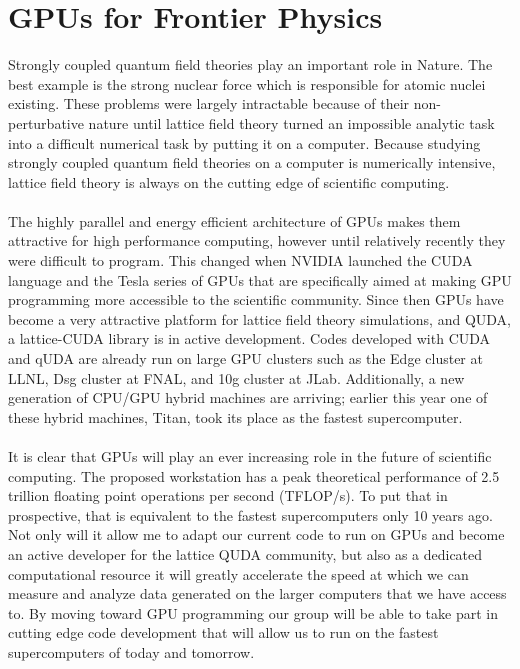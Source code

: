 \documentclass[11pt]{article}
\begin{document}
  \section*{GPUs for Frontier Physics}
  Strongly coupled quantum field theories play an important role in Nature.
  The best example is the strong nuclear force which is responsible for atomic nuclei existing.
  These problems were largely intractable because of their non-perturbative nature until lattice field theory turned an impossible analytic task into a difficult numerical task by putting it on a computer.
  Because studying strongly coupled quantum field theories  on a computer is numerically intensive, lattice field theory is always on the cutting edge of scientific computing. \\\\
 The highly parallel and energy efficient architecture of GPUs makes them attractive for high performance computing, however until relatively recently they were difficult to program.  
 This changed when NVIDIA launched the CUDA language and the Tesla series of GPUs that are specifically aimed at making GPU programming more accessible to the scientific community.
  Since then GPUs have become a very attractive platform for lattice field theory simulations, and QUDA, a lattice-CUDA library \cite{QUDA1,QUDA2,QUDA3} is in active development.
   Codes developed with CUDA and qUDA are already run on large GPU clusters such as the Edge cluster at LLNL, Dsg cluster at FNAL, and 10g cluster at JLab.
  Additionally, a new generation of CPU/GPU hybrid machines are arriving; earlier this year one of these hybrid machines, Titan, took its place as the fastest supercomputer.\\\\
  It is clear that GPUs will play an ever increasing role in the future of scientific computing. 
  The proposed workstation has a peak theoretical performance of 2.5 trillion floating point operations per second (TFLOP/s).
  To put that in prospective, that is equivalent to the fastest supercomputers only 10 years ago.
  Not only will it allow me to adapt our current code to run on GPUs and become an active developer for the lattice QUDA community, but also as a dedicated computational resource it will greatly accelerate the speed at which we can measure and analyze data generated on the larger computers that we have access to.
  By moving toward GPU programming our group will be able to take part in cutting edge code development that will allow us to run on the fastest supercomputers of today and tomorrow.
    
\end{document}
